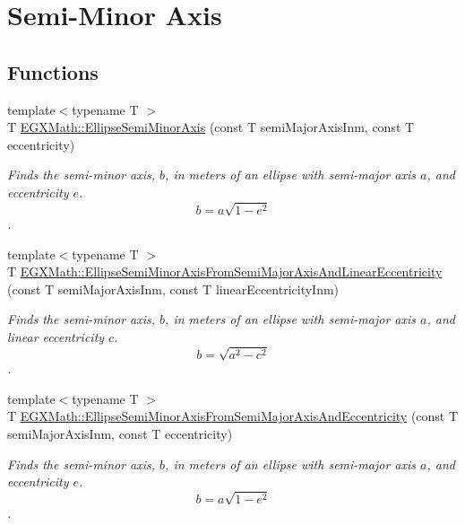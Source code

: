 \hypertarget{group___e_g_x_math-_geometry-2_d-_ellipse-_semi_minor_axis}{}\section{Semi-\/\+Minor Axis}
\label{group___e_g_x_math-_geometry-2_d-_ellipse-_semi_minor_axis}
\subsection*{Functions}
\begin{DoxyCompactItemize}
\item 
{\footnotesize template$<$typename T $>$ }\\T \mbox{\hyperlink{group___e_g_x_math-_geometry-2_d-_ellipse-_semi_minor_axis_gae461acf3333565d69527dd86e9aa2b32}{E\+G\+X\+Math\+::\+Ellipse\+Semi\+Minor\+Axis}} (const T semi\+Major\+Axis\+Inm, const T eccentricity)
\begin{DoxyCompactList}\small\item\em Finds the semi-\/minor axis, $b$, in meters of an ellipse with semi-\/major axis $a$, and eccentricity $e$. \[ b=a \sqrt{1-e^2} \]. \end{DoxyCompactList}\item 
{\footnotesize template$<$typename T $>$ }\\T \mbox{\hyperlink{group___e_g_x_math-_geometry-2_d-_ellipse-_semi_minor_axis_ga001beab4a083da9dd00dace28e749284}{E\+G\+X\+Math\+::\+Ellipse\+Semi\+Minor\+Axis\+From\+Semi\+Major\+Axis\+And\+Linear\+Eccentricity}} (const T semi\+Major\+Axis\+Inm, const T linear\+Eccentricity\+Inm)
\begin{DoxyCompactList}\small\item\em Finds the semi-\/minor axis, $b$, in meters of an ellipse with semi-\/major axis $a$, and linear eccentricity $c$. \[ b=\sqrt{a^2-c^2} \]. \end{DoxyCompactList}\item 
{\footnotesize template$<$typename T $>$ }\\T \mbox{\hyperlink{group___e_g_x_math-_geometry-2_d-_ellipse-_semi_minor_axis_gad0febd8680a3952ae50ce6ddea584b34}{E\+G\+X\+Math\+::\+Ellipse\+Semi\+Minor\+Axis\+From\+Semi\+Major\+Axis\+And\+Eccentricity}} (const T semi\+Major\+Axis\+Inm, const T eccentricity)
\begin{DoxyCompactList}\small\item\em Finds the semi-\/minor axis, $b$, in meters of an ellipse with semi-\/major axis $a$, and eccentricity $e$. \[ b=a \sqrt{1-e^2} \]. \end{DoxyCompactList}\item 

\end{DoxyCompactItemize}
